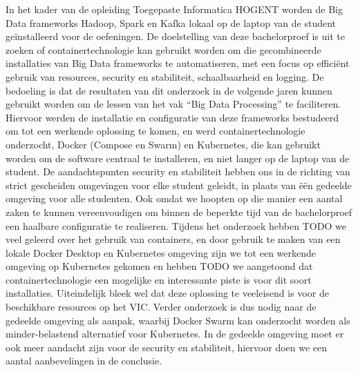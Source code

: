 In het kader van de opleiding Toegepaste Informatica HOGENT worden de Big Data frameworks Hadoop, Spark en Kafka lokaal op de laptop van de student geïnstalleerd voor de oefeningen.
De doelstelling van deze bachelorproef is uit te zoeken of containertechnologie kan gebruikt worden om die gecombineerde installaties van Big Data frameworks te automatiseren, met een focus op efficiënt gebruik van resources, security en stabiliteit, schaalbaarheid en logging. De bedoeling is dat de resultaten van dit onderzoek in de volgende jaren kunnen gebruikt worden om de lessen van het vak ``Big Data Processing'' te faciliteren.
\newline
Hiervoor werden de installatie en configuratie van deze frameworks bestudeerd om tot een werkende oplossing te komen, en werd containertechnologie onderzocht, Docker (Compose en Swarm) en Kubernetes, die kan gebruikt worden om de software centraal te installeren, en niet langer op de laptop van de student.
\newline
De aandachtspunten security en stabiliteit hebben ons in de richting van strict gescheiden omgevingen voor elke student geleidt, in plaats van ëën gedeelde omgeving voor alle studenten. Ook omdat we hoopten op die manier een aantal zaken te kunnen vereenvoudigen om binnen de beperkte tijd van de bachelorproef een haalbare configuratie te realiseren.
\newline
Tijdens het onderzoek hebben TODO we veel geleerd over het gebruik van containers, en door gebruik te maken van een lokale Docker Desktop en Kubernetes omgeving zijn we tot een werkende omgeving op Kubernetes gekomen en hebben TODO we aangetoond dat containertechnologie een mogelijke en interessante piste is voor dit soort installaties.
\newline
Uiteindelijk bleek wel dat deze oplossing te veeleisend is voor de beschikbare resources op het VIC. Verder onderzoek is dus nodig naar de gedeelde omgeving als aanpak, waarbij Docker Swarm kan onderzocht worden als minder-belastend alternatief voor Kubernetes. In de gedeelde omgeving moet er ook meer aandacht zijn voor de security en stabiliteit, hiervoor doen we een aantal aanbevelingen in de conclusie.
\newline
\newline
